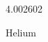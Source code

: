 \documentclass[12pt]{article}
\begin{document}
\hfill{}
\vfill
\begin{center}
  {\fontsize{50}{60}
  }

  4.002602

Helium
\end{center}
\vfill
\end{document}
